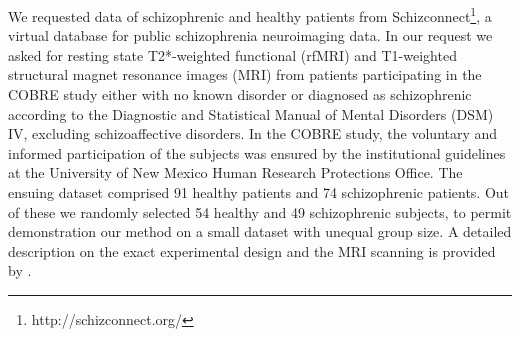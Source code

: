 \documentclass[%
]{frontiersSCNS-nologo} %
\renewcommand*{\|}{\mathpunct{|}}%
\begin{document}
We requested data of schizophrenic and healthy patients from
Schizconnect\footnote{http://schizconnect.org/},
a virtual database for public schizophrenia neuroimaging data. In our
request we asked for resting state T2*-weighted functional (rfMRI) and
T1-weighted structural magnet resonance images (MRI) from patients
participating in the COBRE study either with no known disorder or diagnosed
as schizophrenic according to the Diagnostic and Statistical Manual of
Mental Disorders (DSM) IV, excluding schizoaffective disorders. In the
COBRE study, the voluntary and informed participation of the subjects was
ensured by the institutional guidelines at the University of New Mexico
Human Research Protections Office. The ensuing dataset comprised 91 healthy
patients and 74 schizophrenic patients. Out of these we randomly selected
54 healthy and 49 schizophrenic subjects, to permit demonstration our
method on a small dataset with unequal group size. A detailed description
on the exact experimental design and the MRI scanning is provided by
\cite{Cetin2014}.
\end{document}
